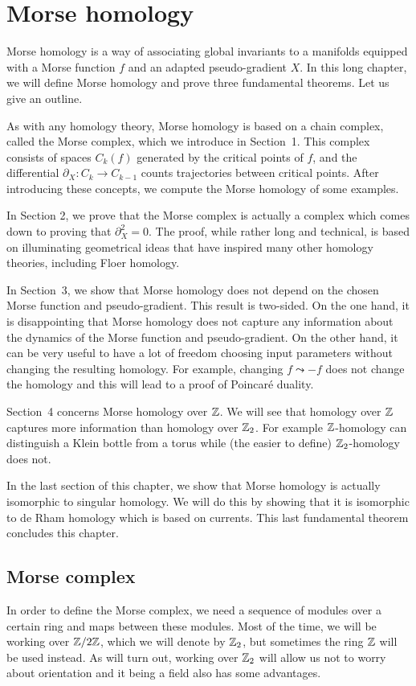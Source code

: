 \chapter{Morse homology}
\label{chap:morse-homology}

Morse homology is a way of associating global invariants to a manifolds equipped with a Morse function $f$ and an adapted pseudo-gradient $X$.
In this long chapter, we will define Morse homology and prove three fundamental theorems. Let us give an outline.

As with any homology theory, Morse homology is based on a chain complex, called the Morse complex, which we introduce in Section~1.
This complex consists of spaces $C_k(f)$ generated by the critical points of  $f$, and the differential $\partial_X: C_k \to  C_{k-1}$ counts trajectories between critical points. After introducing these concepts, we compute the Morse homology of some examples.

In Section 2, we prove that the Morse complex is actually a complex which comes down to proving that $\partial_X^2 = 0$.
The proof, while rather long and technical, is based on illuminating geometrical ideas that have inspired many other homology theories, including Floer homology.

In Section~3, we show that Morse homology does not depend on the chosen Morse function and pseudo-gradient.
This result is two-sided. On the one hand, it is disappointing that Morse homology does not capture any information about the dynamics of the Morse function and pseudo-gradient. On the other hand, it can be very useful to have a lot of freedom choosing input parameters without changing the resulting homology. For example, changing $f \leadsto -f$ does not change the homology and this will lead to a proof of Poincaré duality.

Section~4 concerns Morse homology over $\mathbb{Z}$. We will see that homology over $\mathbb{Z}$ captures more information than homology over $\mathbb{Z}_2$. For example $\mathbb{Z}$-homology can distinguish a Klein bottle from a torus while (the easier to define) $\mathbb{Z}_2$-homology does not.

In the last section of this chapter, we show that Morse homology is actually isomorphic to singular homology.
We will do this by showing that it is isomorphic to de Rham homology which is based on currents. This last fundamental theorem concludes this chapter.


\section{Morse complex}
In order to define the Morse complex, we need a sequence of modules over a certain ring and maps between these modules.
Most of the time, we will be working over $\mathbb{Z}/2\mathbb{Z}$, which we will denote by $\mathbb{Z}_2$, but sometimes the ring $\mathbb{Z}$ will be used instead. As will turn out, working over $\mathbb{Z}_2$ will allow us not to worry about orientation and it being a field also has some advantages.

